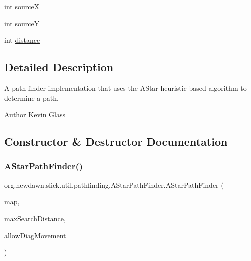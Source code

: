 \begin{DoxyCompactItemize}
\item 
int \mbox{\hyperlink{classorg_1_1newdawn_1_1slick_1_1util_1_1pathfinding_1_1_a_star_path_finder_aa57984b3f637153ce573e88bb635e87b}{sourceX}}
\item 
int \mbox{\hyperlink{classorg_1_1newdawn_1_1slick_1_1util_1_1pathfinding_1_1_a_star_path_finder_a925d628f5ff0f25f13508a117c1ea663}{sourceY}}
\item 
int \mbox{\hyperlink{classorg_1_1newdawn_1_1slick_1_1util_1_1pathfinding_1_1_a_star_path_finder_a8c4940ca4de03b42628e5cc6145e1390}{distance}}
\end{DoxyCompactItemize}


\subsection{Detailed Description}
A path finder implementation that uses the A\+Star heuristic based algorithm to determine a path.

\begin{DoxyAuthor}{Author}
Kevin Glass 
\end{DoxyAuthor}


\subsection{Constructor \& Destructor Documentation}
\mbox{\label{classorg_1_1newdawn_1_1slick_1_1util_1_1pathfinding_1_1_a_star_path_finder_ab47a3757f6298f52419b2ec6a6b1a998}} 
\subsubsection{\texorpdfstring{A\+Star\+Path\+Finder()}{AStarPathFinder()}\hspace{0.1cm}{\footnotesize\ttfamily [1/2]}}
{\footnotesize\ttfamily org.\+newdawn.\+slick.\+util.\+pathfinding.\+A\+Star\+Path\+Finder.\+A\+Star\+Path\+Finder (\begin{DoxyParamCaption}\item[{\mbox{\hyperlink{interfaceorg_1_1newdawn_1_1slick_1_1util_1_1pathfinding_1_1_tile_based_map}{Tile\+Based\+Map}}}]{map,  }\item[{int}]{max\+Search\+Distance,  }\item[{boolean}]{allow\+Diag\+Movement }\end{DoxyParamCaption})\hspace{0.3cm}{\ttfamily [inline]}}

